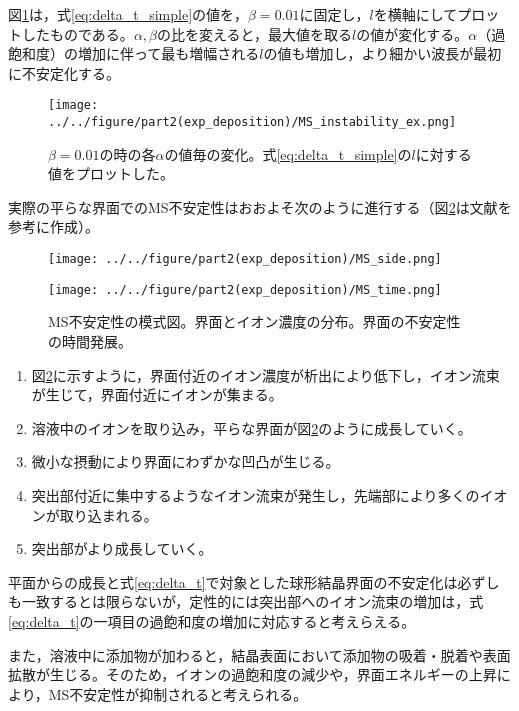 \documentclass[autodetect-engine,dvi=dvipdfmx,a4paper,ja=standard,oneside,openany]{bxjsbook}
\begin{document}
図\ref{fig:MS_instability_ex}は，式\eqref{eq:delta_t_simple}の値を，$\beta=0.01$に固定し，$l$を横軸にしてプロットしたものである。$\alpha,\beta$の比を変えると，最大値を取る$l$の値が変化する。$\alpha$（過飽和度）の増加に伴って最も増幅される$l$の値も増加し，より細かい波長が最初に不安定化する。

\begin{figure}[htbp]
  \centering
  \texttt{[image: ../../figure/part2(exp\_deposition)/MS\_instability\_ex.png]}
  \caption{$\beta=0.01$の時の各$\alpha$の値毎の変化。式\eqref{eq:delta_t_simple}の$l$に対する値をプロットした。}
  \label{fig:MS_instability_ex}
\end{figure}

実際の平らな界面でのMS不安定性はおおよそ次のように進行する（図\ref{fig:MS}は文献\cite{結晶成長}を参考に作成）。

\begin{figure}[htbp]
  \begin{minipage}
    {0.5\textwidth}
    \subcaption{}
    \centering
    \texttt{[image: ../../figure/part2(exp\_deposition)/MS\_side.png]}
    \label{fig:MS_side}
  \end{minipage}
  \begin{minipage}
    {0.5\textwidth}
    \subcaption{}
    \centering
    \texttt{[image: ../../figure/part2(exp\_deposition)/MS\_time.png]}
    \label{fig:MS_top}
  \end{minipage}
  \caption{MS不安定性の模式図。界面とイオン濃度の分布。界面の不安定性の時間発展。}
  \label{fig:MS}
\end{figure}

\begin{enumerate}
  \item 図\ref{fig:MS}に示すように，界面付近のイオン濃度が析出により低下し，イオン流束が生じて，界面付近にイオンが集まる。
  \item 溶液中のイオンを取り込み，平らな界面が図\ref{fig:MS}のように成長していく。
  \item 微小な摂動により界面にわずかな凹凸が生じる。
  \item 突出部付近に集中するようなイオン流束が発生し，先端部により多くのイオンが取り込まれる。
  \item 突出部がより成長していく。
\end{enumerate}
平面からの成長と式\eqref{eq:delta_t}で対象とした球形結晶界面の不安定化は必ずしも一致するとは限らないが，定性的には突出部へのイオン流束の増加は，式\eqref{eq:delta_t}の一項目の過飽和度の増加に対応すると考えらえる。

また，溶液中に添加物が加わると，結晶表面において添加物の吸着・脱着や表面拡散が生じる。そのため，イオンの過飽和度の減少や，界面エネルギーの上昇により，MS不安定性が抑制されると考えられる。

\ifdraft{
  
  
}{}
\end{document}
